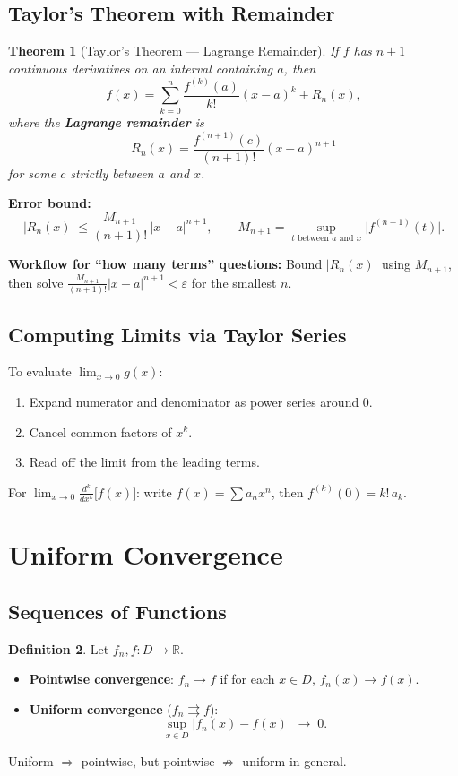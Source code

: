 \documentclass[12pt, a4paper]{article}
\newtheorem{theorem}{Theorem}[section]
\theoremstyle{definition}
\newtheorem{definition}[theorem]{Definition}
\theoremstyle{remark}
\begin{document}
\subsection{Taylor's Theorem with Remainder}

\begin{theorem}[Taylor's Theorem --- Lagrange Remainder]
If $f$ has $n+1$ continuous derivatives on an interval containing $a$, then
\[
  f(x) = \sum_{k=0}^n \frac{f^{(k)}(a)}{k!}(x-a)^k + R_n(x),
\]
where the \textbf{Lagrange remainder} is
\[
  R_n(x) = \frac{f^{(n+1)}(c)}{(n+1)!}(x-a)^{n+1}
\]
for some $c$ strictly between $a$ and $x$.
\end{theorem}

\textbf{Error bound:}
\[
  |R_n(x)| \leq \frac{M_{n+1}}{(n+1)!}\,|x-a|^{n+1},
  \qquad M_{n+1} = \sup_{t \text{ between } a \text{ and } x}\bigl|f^{(n+1)}(t)\bigr|.
\]

\textbf{Workflow for ``how many terms'' questions:}
Bound $|R_n(x)|$ using $M_{n+1}$, then solve $\frac{M_{n+1}}{(n+1)!}|x-a|^{n+1} < \varepsilon$ for the smallest $n$.

\subsection{Computing Limits via Taylor Series}

To evaluate $\lim_{x\to 0} g(x)$:
\begin{enumerate}
  \item Expand numerator and denominator as power series around 0.
  \item Cancel common factors of $x^k$.
  \item Read off the limit from the leading terms.
\end{enumerate}
For $\lim_{x\to 0} \frac{d^k}{dx^k}\bigl[f(x)\bigr]$: write $f(x) = \sum a_n x^n$, then $f^{(k)}(0) = k!\,a_k$.

\section{Uniform Convergence}

\subsection{Sequences of Functions}

\begin{definition}
Let $f_n, f : D \to \mathbb{R}$.
\begin{itemize}
  \item \textbf{Pointwise convergence}: $f_n \to f$ if for each $x \in D$, $f_n(x) \to f(x)$.
  \item \textbf{Uniform convergence} ($f_n \rightrightarrows f$):
    \[
      \sup_{x \in D}|f_n(x) - f(x)| \;\to\; 0.
    \]
\end{itemize}
Uniform $\Rightarrow$ pointwise, but pointwise $\not\Rightarrow$ uniform in general.
\end{definition}
\end{document}
